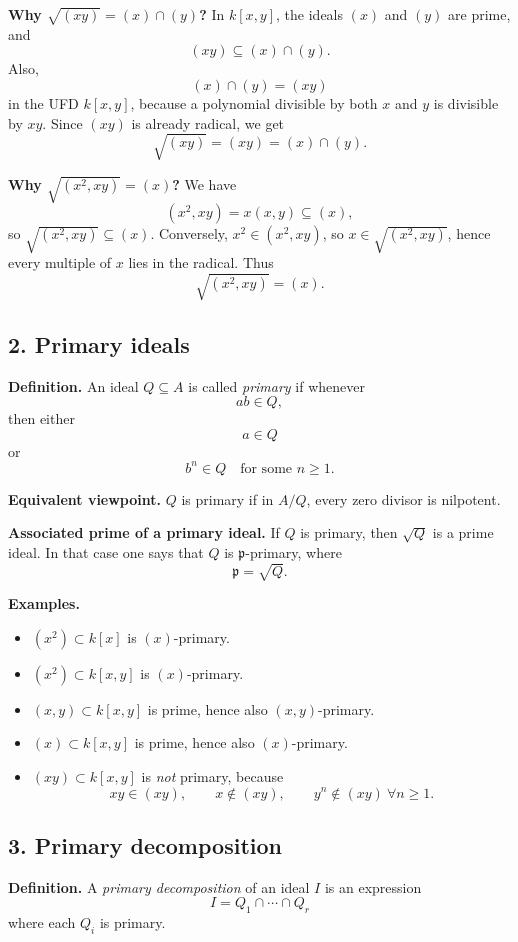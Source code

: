 \documentclass[12pt,a4paper]{article}
\theoremstyle{notespace}
\begin{document}
\textbf{Why \(\sqrt{(xy)}=(x)\cap(y)\)?}
In \(k[x,y]\), the ideals \((x)\) and \((y)\) are prime, and
\[
(xy)\subseteq (x)\cap(y).
\]
Also,
\[
(x)\cap(y)=(xy)
\]
in the UFD \(k[x,y]\), because a polynomial divisible by both \(x\) and \(y\) is divisible by \(xy\).
Since \((xy)\) is already radical, we get
\[
\sqrt{(xy)}=(xy)=(x)\cap(y).
\]

\textbf{Why \(\sqrt{(x^2,xy)}=(x)\)?}
We have
\[
(x^2,xy)=x(x,y)\subseteq (x),
\]
so \(\sqrt{(x^2,xy)}\subseteq (x)\).
Conversely, \(x^2\in (x^2,xy)\), so \(x\in \sqrt{(x^2,xy)}\), hence every multiple of \(x\) lies in the radical.
Thus
\[
\sqrt{(x^2,xy)}=(x).
\]

\subsection{2. Primary ideals}

\textbf{Definition.}
An ideal \(Q\subseteq A\) is called \emph{primary} if whenever
\[
ab\in Q,
\]
then either
\[
a\in Q
\]
or
\[
b^n\in Q\quad \text{for some }n\ge 1.
\]

\textbf{Equivalent viewpoint.}
\(Q\) is primary if in \(A/Q\), every zero divisor is nilpotent.

\textbf{Associated prime of a primary ideal.}
If \(Q\) is primary, then \(\sqrt Q\) is a prime ideal.
In that case one says that \(Q\) is \(\mathfrak p\)-primary, where
\[
\mathfrak p=\sqrt Q.
\]

\textbf{Examples.}
\begin{itemize}
	\item \((x^2)\subset k[x]\) is \((x)\)-primary.
	\item \((x^2)\subset k[x,y]\) is \((x)\)-primary.
	\item \((x,y)\subset k[x,y]\) is prime, hence also \((x,y)\)-primary.
	\item \((x)\subset k[x,y]\) is prime, hence also \((x)\)-primary.
	\item \((xy)\subset k[x,y]\) is \emph{not} primary, because
	\[
	xy\in (xy),\qquad x\notin (xy),\qquad y^n\notin (xy)\ \forall n\ge 1.
	\]
\end{itemize}

\subsection{3. Primary decomposition}

\textbf{Definition.}
A \emph{primary decomposition} of an ideal \(I\) is an expression
\[
I=Q_1\cap \cdots \cap Q_r
\]
where each \(Q_i\) is primary.
\end{document}
